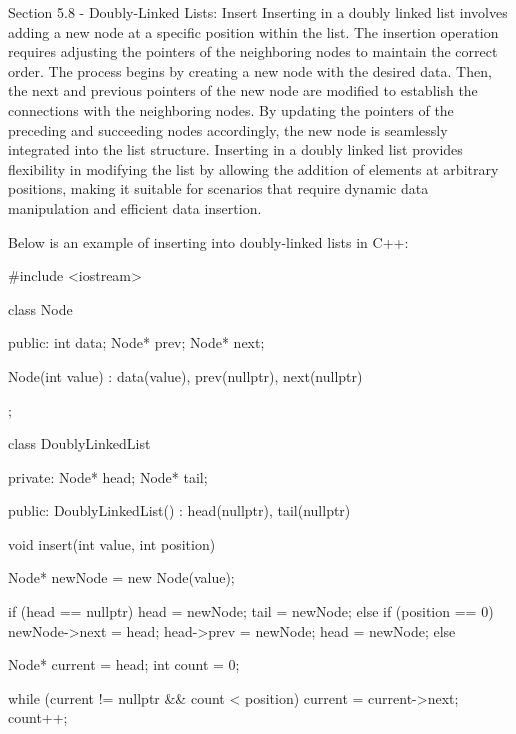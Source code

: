 \begin{notes}{Section 5.8 - Doubly-Linked Lists: Insert}
    Inserting in a doubly linked list involves adding a new node at a specific position within the list. The insertion operation requires adjusting the pointers of the neighboring nodes to maintain the correct order. The process begins by creating a new node with the desired data. Then, the next and previous pointers of the 
    new node are modified to establish the connections with the neighboring nodes. By updating the pointers of the preceding and succeeding nodes accordingly, the new node is seamlessly integrated into the list structure. Inserting in a doubly linked list provides flexibility in modifying the list by allowing the addition of 
    elements at arbitrary positions, making it suitable for scenarios that require dynamic data manipulation and efficient data insertion.
    
    \begin{highlight}
        Below is an example of inserting into doubly-linked lists in C++:
    
        \begin{code}[C++]
        #include <iostream>
    
        class Node {
        public:
            int data;
            Node* prev;
            Node* next;
        
            Node(int value) : data(value), prev(nullptr), next(nullptr) {}
        };
        
        class DoublyLinkedList {
        private:
            Node* head;
            Node* tail;
        
        public:
            DoublyLinkedList() : head(nullptr), tail(nullptr) {}
        
            void insert(int value, int position) {
                Node* newNode = new Node(value);
        
                if (head == nullptr) {
                    head = newNode;
                    tail = newNode;
                } else if (position == 0) {
                    newNode->next = head;
                    head->prev = newNode;
                    head = newNode;
                } else {
                    Node* current = head;
                    int count = 0;
        
                    while (current != nullptr && count < position) {
                        current = current->next;
                        count++;
                    }
        
}}}
\end{code}
\end{highlight}
\end{notes}
